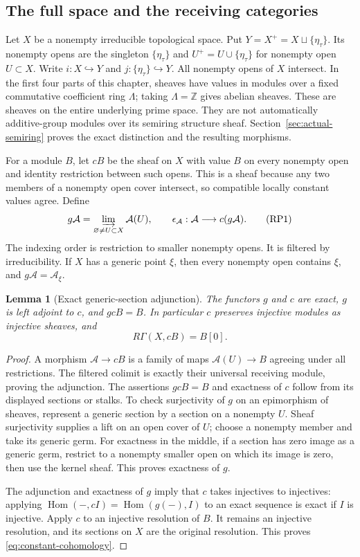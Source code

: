 \documentclass[11pt,a4paper]{article}
\newtheorem{lemma}[theorem]{Lemma}
\theoremstyle{definition}\newtheorem{definition}[theorem]{Definition}
\providecommand{\Hom}{\operatorname{Hom}}
\begin{document}
\subsection{The full space and the receiving categories}

Let $X$ be a nonempty irreducible topological space. Put
$Y=X^+=X\sqcup\{\eta_\tau\}$. Its nonempty opens are the singleton
$\{\eta_\tau\}$ and $U^+=U\cup\{\eta_\tau\}$ for nonempty open
$U\subset X$. Write $i:X\hookrightarrow Y$ and
$j:\{\eta_\tau\}\hookrightarrow Y$. All nonempty opens of $X$ intersect.
In the first four parts of this chapter, sheaves have values in modules over a fixed commutative
coefficient ring $\Lambda$; taking $\Lambda=\mathbb Z$ gives abelian
sheaves. These are sheaves on the entire underlying prime space.
They are not automatically additive-group modules over its semiring
structure sheaf. Section~\ref{sec:actual-semiring} proves the exact
distinction and the resulting morphisms.

For a module $B$, let $cB$ be the sheaf on $X$ with value $B$ on every
nonempty open and identity restriction between such opens. This is a
sheaf because any two members of a nonempty open cover intersect, so
compatible locally constant values agree. Define
\[
 g\mathcal A=\varinjlim_{\varnothing\ne U\subset X}\mathcal A(U),
 \qquad \epsilon_{\mathcal A}:\mathcal A\longrightarrow c(g\mathcal A).
 \tag{RP1}\label{eq:generic-functor}
\]
The indexing order is restriction to smaller nonempty opens. It is
filtered by irreducibility. If $X$ has a generic point $\xi$, then every
nonempty open contains $\xi$, and $g\mathcal A=\mathcal A_\xi$.

\begin{lemma}[Exact generic-section adjunction]\label{lem:generic}
The functors $g$ and $c$ are exact, $g$ is left adjoint to $c$, and
$gcB=B$. In particular $c$ preserves injective modules as injective
sheaves, and
\[
 R\Gamma(X,cB)=B[0].
 \tag{RP2}\label{eq:constant-cohomology}
\]
\end{lemma}
\begin{proof}
A morphism $\mathcal A\to cB$ is a family of maps
$\mathcal A(U)\to B$ agreeing under all restrictions. The filtered
colimit is exactly their universal receiving module, proving the
adjunction. The assertions $gcB=B$ and exactness of $c$ follow from its
displayed sections or stalks. To check surjectivity of $g$ on an
epimorphism of sheaves, represent a generic section by a section on a
nonempty $U$. Sheaf surjectivity supplies a lift on an open cover of
$U$; choose a nonempty member and take its generic germ. For exactness
in the middle, if a section has zero image as a generic germ, restrict
to a nonempty smaller open on which its image is zero, then use the
kernel sheaf. This proves exactness of $g$.

The adjunction and exactness of $g$ imply that $c$ takes injectives to
injectives: applying $\Hom(-,cI)=\Hom(g(-),I)$ to an exact sequence is
exact if $I$ is injective. Apply $c$ to an injective resolution of $B$.
It remains an injective resolution, and its sections on $X$ are the
original resolution. This proves \eqref{eq:constant-cohomology}.
\end{proof}
\end{document}
